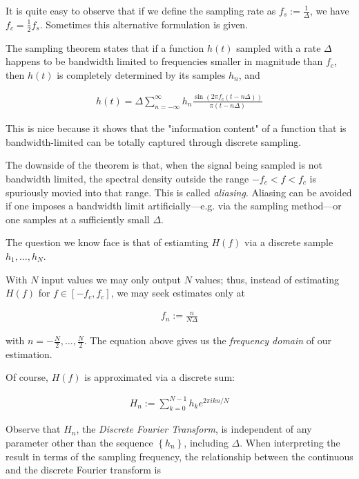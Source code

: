 \documentclass[a4paper, 12pt]{article}
\begin{document}
It is quite easy to observe that if we define the sampling rate as $f_s :=
\frac{1}{\Delta}$, we have $f_c = \frac{1}{2}f_s$. Sometimes this alternative
formulation is given.

The sampling theorem states that if a function $h(t)$ sampled with a rate
$\Delta$ happens to be bandwidth limited to frequencies smaller in magnitude
than $f_c$, then $h(t)$ is completely determined by its samples $h_n$, and 

\begin{align*}
    h(t) = \Delta \sum_{n=-\infty}^{\infty} h_n \frac{\sin \left( 2\pi f_c(t - n\Delta) \right) }{\pi(t - n\Delta)}
\end{align*}

This is nice because it shows that the "information content" of a function that
is bandwidth-limited can be totally captured through discrete sampling.

The downside of the theorem is that, when the signal being sampled is not
bandwidth limited, the spectral density outside the range $-f_c < f < f_c$ is
spuriously movied into that range. This is called \textit{aliasing}. Aliasing
can be avoided if one imposes a bandwidth limit artificially---e.g. via the
sampling method---or one samples at a sufficiently small $\Delta$.

The question we know face is that of estiamting $H(f)$ via a discrete sample
$h_1, \ldots, h_N$. 

With $N$ input values we may only output $N$ values; thus, instead of
estimating $H(f)$ for $f \in [-f_c, f_c]$, we may seek estimates only at 

\begin{align*}
    f_n := \frac{n}{N\Delta}  
\end{align*}

with $n = -\frac{N}{2}, \ldots, \frac{N}{2}$. The equation above gives us the
\textit{frequency domain} of our estimation.

Of course, $H(f)$ is approximated via a discrete sum: 

\begin{align*}
    H_n := \sum_{k=0}^{N - 1} h_k e^{2\pi i k n / N}
\end{align*}

Observe that $H_n$, the \textit{Discrete Fourier Transform}, is independent of any parameter other than the sequence $\left\{ h_n \right\} $, including $\Delta$. When interpreting the result in terms of the sampling frequency, the relationship between the continuous and the discrete Fourier transform is 
\end{document}
